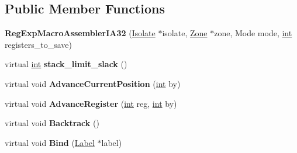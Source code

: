 \subsection*{Public Member Functions}
\begin{DoxyCompactItemize}
\item 
\mbox{\label{classv8_1_1internal_1_1RegExpMacroAssemblerIA32_acfcd0b7e094e612cbc8e1737858e2364}} 
{\bfseries Reg\+Exp\+Macro\+Assembler\+I\+A32} (\mbox{\hyperlink{classv8_1_1internal_1_1Isolate}{Isolate}} $\ast$isolate, \mbox{\hyperlink{classv8_1_1internal_1_1Zone}{Zone}} $\ast$zone, Mode mode, \mbox{\hyperlink{classint}{int}} registers\+\_\+to\+\_\+save)
\item 
\mbox{\label{classv8_1_1internal_1_1RegExpMacroAssemblerIA32_ad96cfd439f89c5a5344abe800ba067b3}} 
virtual \mbox{\hyperlink{classint}{int}} {\bfseries stack\+\_\+limit\+\_\+slack} ()
\item 
\mbox{\label{classv8_1_1internal_1_1RegExpMacroAssemblerIA32_a916b914594f580c9d2be0529b45e6119}} 
virtual void {\bfseries Advance\+Current\+Position} (\mbox{\hyperlink{classint}{int}} by)
\item 
\mbox{\label{classv8_1_1internal_1_1RegExpMacroAssemblerIA32_adbd3b2736d3ec8c485d27bec5d8d036f}} 
virtual void {\bfseries Advance\+Register} (\mbox{\hyperlink{classint}{int}} reg, \mbox{\hyperlink{classint}{int}} by)
\item 
\mbox{\label{classv8_1_1internal_1_1RegExpMacroAssemblerIA32_a35ce7638883eef399d53c7762255f881}} 
virtual void {\bfseries Backtrack} ()
\item 
\mbox{\label{classv8_1_1internal_1_1RegExpMacroAssemblerIA32_a94397279fdc1f7bbaf8d93d843f8c575}} 
virtual void {\bfseries Bind} (\mbox{\hyperlink{classv8_1_1internal_1_1Label}{Label}} $\ast$label)
\item 
\mbox{\label{classv8_1_1internal_1_1RegExpMacroAssemblerIA32_a9ee06138571bafc6d9d9b8595faa6f4e}} 

\end{DoxyCompactItemize}
